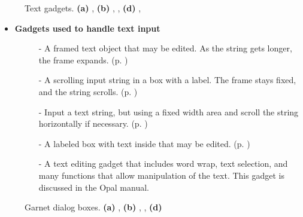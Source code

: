 \begin{group}
\begin{figure}
\begin{center}
 \end{center}
\caption{Text gadgets.  {\bf (a)} ,
{\bf (b)} , ,
{\bf (d)} , }
\end{figure}

\begin{itemize}
\item {\bf Gadgets used to handle text input}
\begin{description}
\item[]  -  A framed text object that may be edited.  As the string
gets longer, the frame expands.  (p. \pageref{labeled-box})

\item[]  - A scrolling input string in a box with a label.
The frame stays fixed, and the string scrolls.
(p. \pageref{scrolling-labeled-box})

\item[]  - Input a text string, but using a fixed width
area and scroll the string horizontally if necessary.
(p. \pageref{scrolling-input-string})

\item[]  - A labeled box with text inside that may
be edited.  (p. \pageref{motif-scrolling-labeled-box})

\item[]  - A text editing gadget that includes word wrap,
text selection, and many functions that allow manipulation of the
text.  This gadget is discussed in the Opal manual.

\end{description}
\end{itemize}
\end{group}



\begin{figure}
\begin{center}
\end{center}
\caption{Garnet dialog boxes.  {\bf (a)} ,
{\bf (b)} , ,
{\bf (d)} }
\end{figure}

